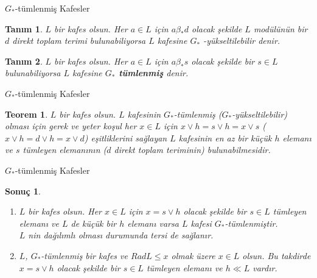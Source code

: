 \documentclass[mathserif]{beamer}
\newtheorem*{teorem}{Teorem}
\newtheorem*{sonuc}{Sonuç}
\newtheorem*{tanim}{Tanım}
\begin{document}
\begin{frame}{$ G_* $-tümlenmiş Kafesler}

  \begin{tanim}
    $ L $ bir kafes olsun. Her $ a \in L $ için $ a \beta_* d $ olacak şekilde
    $ L $ modülünün bir $ d $ direkt toplam terimi bulunabiliyorsa $ L $ kafesine \boldmath $ G_* $ \unboldmath -yükseltilebilir denir.

  \end{tanim}



  \begin{tanim}
    $ L $ bir kafes olsun. Her $ a \in L $ için $ a \beta_* s $ olacak şekilde bir $ s \in L $ 
    bulunabiliyorsa $ L $ kafesine \textbf{$ G_* $ tümlenmiş} denir.

  \end{tanim}

\end{frame}
\begin{frame}{$ G_* $-tümlenmiş Kafesler}
  \begin{teorem}
    $ L $ bir kafes olsun. $ L $ kafesinin $ G_* $-tümlenmiş ($ G_* $-yükseltilebilir) olması için gerek ve yeter koşul 
    her $ x \in L $ için $ x \vee h = s \vee h = x \vee s $ ($ x \vee h = d \vee h = x \vee d $) eşitliklerini sağlayan $ L $ kafesinin 
    en az bir küçük $ h $ elemanı ve $ s $ tümleyen elemanının ($ d $ direkt toplam teriminin) bulunabilmesidir.
  \end{teorem}
\end{frame}

\begin{frame}{$ G_* $-tümlenmiş Kafesler}
  \begin{sonuc}
    \begin{enumerate}
      \item 
        $ L $ bir kafes olsun. Her $ x \in L $ için $ x = s \vee h $ olacak şekilde bir $ s \in L $ 
        tümleyen elemanı ve $ L $ de küçük bir $ h $ elemanı varsa $ L $ kafesi $ G_* $-tümlenmiştir. \\
        $ L $ nin dağılımlı olması durumunda tersi de sağlanır.
      \item
        $ L $, $ G_* $-tümlenmiş bir kafes ve $ RadL \leq x $ olmak üzere $ x \in L $ olsun. 
        Bu takdirde $ x = s \vee h $ olacak şekilde bir $ s \in L $ tümleyen elemanı ve $ h \ll L $ vardır.

    \end{enumerate}
  \end{sonuc}


\end{frame}
\end{document}

